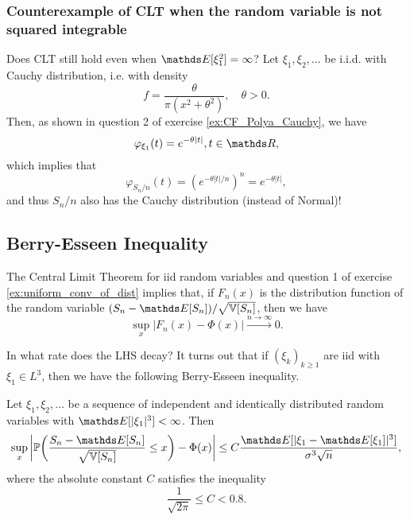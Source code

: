 \subsubsection{Counterexample of CLT when the random variable is not squared integrable}
Does CLT still hold even when $\E[\xi_1^2] = \infty$? Let $\xi_1, \xi_2, \dots$ be i.i.d. with Cauchy distribution, i.e. with density
\begin{equation*}
    f = \frac{\theta}{\pi(x^2 + \theta^2)}, \quad \theta>0.
\end{equation*}
Then, as shown in question 2 of exercise \ref{ex:CF_Polya_Cauchy}, we have
\begin{equation*}
    \varphi_{\xi_1}(t) = e^{-\theta |t|}, t \in \R,
\end{equation*}
which implies that 
\begin{equation*}
    \varphi_{S_n/n} (t) = (e^{-\theta|t|/n})^n = e^{-\theta|t|},
\end{equation*}
and thus $S_n/n$ also has the Cauchy distribution (instead of Normal)!

\subsection{Berry-Esseen Inequality}
The Central Limit Theorem for iid random variables and question 1 of exercise \ref{ex:uniform_conv_of_dist} implies that, if $F_n(x)$ is the distribution function of the random variable $(S_n - \E[S_n])/\sqrt{\V[S_n]}$, then we have
\begin{equation}
\sup_{x} |F_n(x) - \Phi(x)| \overset{n\to\infty}\to 0.
\end{equation}

In what rate does the LHS decay? It turns out that if $(\xi_k)_{k\geq 1}$ are iid with $\xi_1 \in L^3$, then we have the following Berry-Esseen inequality.
\begin{theorem}
Let $\xi_1, \xi_2, \dots$ be a sequence of independent and identically distributed random variables with $\E[|\xi_1|^3] < \infty$. Then
\begin{equation*}
    \sup_x \bigg| \p\bigg( \frac{S_n - \E[S_n]}{\sqrt{\V[S_n]}} \le x\bigg) - \Phi(x) \bigg| \le C\frac{\E[|\xi_1 - \E[\xi_1]|^3]}{\sigma^3\sqrt{n}},
\end{equation*}
where the absolute constant $C$ satisfies the inequality
\begin{equation*}
    \frac{1}{\sqrt{2\pi}} \le C < 0.8.
\end{equation*}
\end{theorem}

